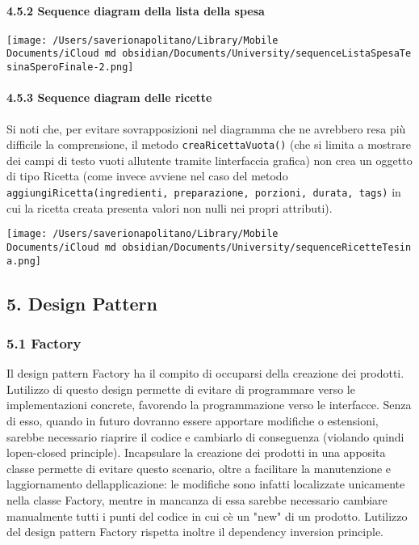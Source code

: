 \documentclass[
]{article}
\begin{document}
\paragraph{4.5.2 Sequence diagram della lista della
spesa}\label{sequence-diagram-della-lista-della-spesa}

\texttt{[image: /Users/saverionapolitano/Library/Mobile Documents/iCloud~md~obsidian/Documents/University/sequenceListaSpesaTesinaSperoFinale-2.png]}

\paragraph{4.5.3 Sequence diagram delle
ricette}\label{sequence-diagram-delle-ricette}

Si noti che, per evitare sovrapposizioni nel diagramma che ne avrebbero
resa più difficile la comprensione, il metodo
\texttt{creaRicettaVuota()} (che si limita a mostrare dei campi di testo
vuoti all\textquotesingle utente tramite l\textquotesingle interfaccia
grafica) non crea un oggetto di tipo Ricetta (come invece avviene nel
caso del metodo
\texttt{aggiungiRicetta(ingredienti,\ preparazione,\ porzioni,\ durata,\ tags)}
in cui la ricetta creata presenta valori non nulli nei propri
attributi).

\texttt{[image: /Users/saverionapolitano/Library/Mobile Documents/iCloud~md~obsidian/Documents/University/sequenceRicetteTesina.png]}

\subsection{5. Design Pattern}\label{design-pattern}

\subsubsection{5.1 Factory}\label{factory}

Il design pattern Factory ha il compito di occuparsi della creazione dei
prodotti. L\textquotesingle utilizzo di questo design permette di
evitare di programmare verso le implementazioni concrete, favorendo la
programmazione verso le interfacce. Senza di esso, quando in futuro
dovranno essere apportare modifiche o estensioni, sarebbe necessario
riaprire il codice e cambiarlo di conseguenza (violando quindi
l\textquotesingle open-closed principle). Incapsulare la creazione dei
prodotti in una apposita classe permette di evitare questo scenario,
oltre a facilitare la manutenzione e l\textquotesingle aggiornamento
dell\textquotesingle applicazione: le modifiche sono infatti localizzate
unicamente nella classe Factory, mentre in mancanza di essa sarebbe
necessario cambiare manualmente tutti i punti del codice in cui
c\textquotesingle è un "new" di un prodotto. L\textquotesingle utilizzo
del design pattern Factory rispetta inoltre il dependency inversion
principle.
\end{document}
